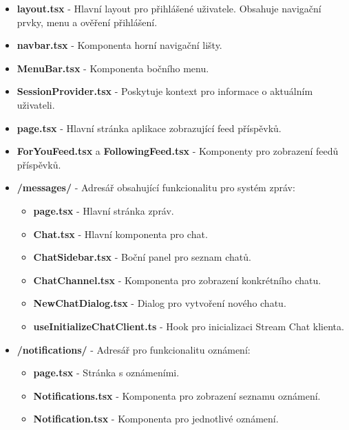 \documentclass[12pt]{article}
\begin{document}
\begin{itemize}
  \item \textbf{layout.tsx} - Hlavní layout pro přihlášené uživatele. Obsahuje navigační prvky, menu a ověření přihlášení.
  
  \item \textbf{navbar.tsx} - Komponenta horní navigační lišty.
  
  \item \textbf{MenuBar.tsx} - Komponenta bočního menu.
  
  \item \textbf{SessionProvider.tsx} - Poskytuje kontext pro informace o aktuálním uživateli.
  
  \item \textbf{page.tsx} - Hlavní stránka aplikace zobrazující feed příspěvků.
  
  \item \textbf{ForYouFeed.tsx} a \textbf{FollowingFeed.tsx} - Komponenty pro zobrazení feedů příspěvků.
  
  \item \textbf{/messages/} - Adresář obsahující funkcionalitu pro systém zpráv:
  \begin{itemize}
    \item \textbf{page.tsx} - Hlavní stránka zpráv.
    \item \textbf{Chat.tsx} - Hlavní komponenta pro chat.
    \item \textbf{ChatSidebar.tsx} - Boční panel pro seznam chatů.
    \item \textbf{ChatChannel.tsx} - Komponenta pro zobrazení konkrétního chatu.
    \item \textbf{NewChatDialog.tsx} - Dialog pro vytvoření nového chatu.
    \item \textbf{useInitializeChatClient.ts} - Hook pro inicializaci Stream Chat klienta.
  \end{itemize}
  
  \item \textbf{/notifications/} - Adresář pro funkcionalitu oznámení:
  \begin{itemize}
    \item \textbf{page.tsx} - Stránka s oznámeními.
    \item \textbf{Notifications.tsx} - Komponenta pro zobrazení seznamu oznámení.
    \item \textbf{Notification.tsx} - Komponenta pro jednotlivé oznámení.
  \end{itemize}
  

\end{itemize}
\end{document}
